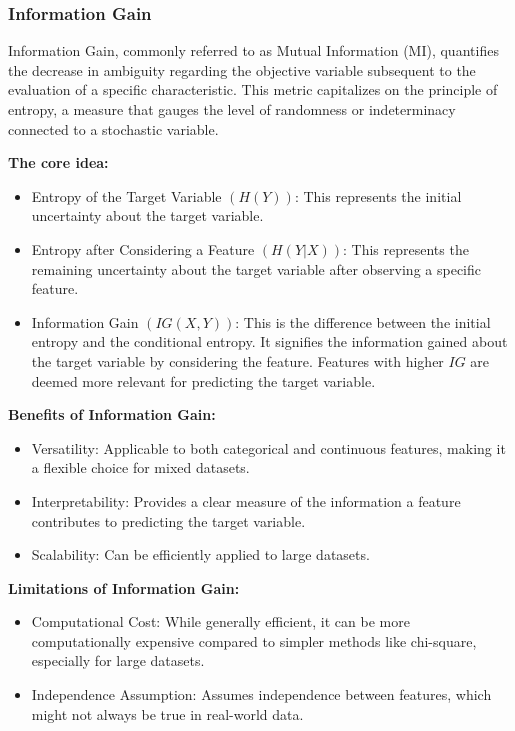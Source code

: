 \documentclass[12pt]{report}
\begin{document}
\subsubsection*{Information Gain}

Information Gain, commonly referred to as Mutual Information (MI), quantifies
the decrease in ambiguity regarding the objective variable subsequent to the
evaluation of a specific characteristic. This metric capitalizes on the
principle of entropy, a measure that gauges the level of randomness or
indeterminacy connected to a stochastic variable\cite{mackay2003information}.

\textbf{The core idea:}
\begin{itemize}
      \item Entropy of the Target Variable $(H(Y))$: This represents the initial
            uncertainty about the target variable.
      \item Entropy after Considering a Feature $(H(Y|X))$: This represents the remaining
            uncertainty about the target variable after observing a specific feature.
      \item Information Gain $(IG(X, Y))$: This is the difference between the initial
            entropy and the conditional entropy. It signifies the information gained about
            the target variable by considering the feature. Features with higher $IG$ are
            deemed more relevant for predicting the target variable.
\end{itemize}

\textbf{Benefits of Information Gain:}

\begin{itemize}
      \item Versatility: Applicable to both categorical and continuous features, making it
            a flexible choice for mixed datasets.
      \item Interpretability: Provides a clear measure of the information a feature
            contributes to predicting the target variable.
      \item Scalability: Can be efficiently applied to large datasets.
\end{itemize}

\textbf{Limitations of Information Gain:}
\begin{itemize}
      \item Computational Cost: While generally efficient, it can be more computationally
            expensive compared to simpler methods like chi-square, especially for large
            datasets.
      \item Independence Assumption: Assumes independence between features, which might not
            always be true in real-world data.
\end{itemize}
\end{document}
